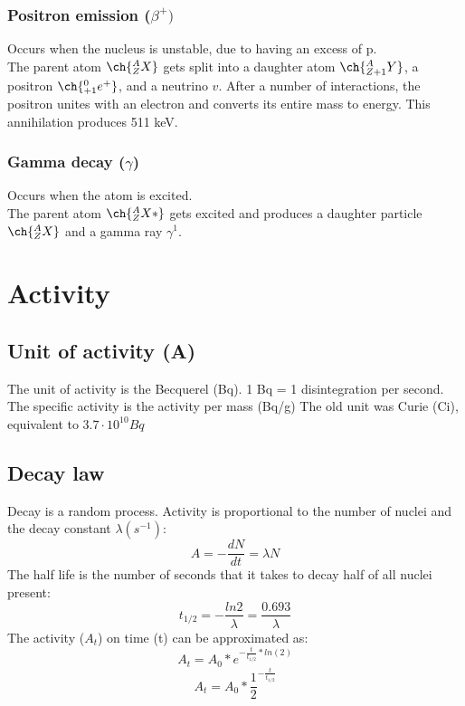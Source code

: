 \subsubsection{Positron emission ($\beta^{+})$}
Occurs when the nucleus is unstable, due to having an excess of p.\\
The parent atom $\ch{^{A}_{Z}X}$ gets split into a daughter atom $\ch{^{A}_{Z+1}Y}$, a positron $\ch{^{0}_{+1}e^{+}}$, and a neutrino $v$.
After a number of interactions, the positron unites with an electron and converts its entire mass to energy. This annihilation produces 511 keV.
\subsubsection{Gamma decay ($\gamma$)}
Occurs when the atom is excited.\\
The parent atom $\ch{^{A}_{Z}X*}$ gets excited and produces a daughter particle $\ch{^{A}_{Z}X}$ and a gamma ray $\gamma^{1}$.
\section{Activity}
\subsection{Unit of activity (A)}
The unit of activity is the Becquerel (Bq). 1 Bq = 1 disintegration per second.
The specific activity is the activity per mass (Bq/g)
The old unit was Curie (Ci), equivalent to $3.7·10^{10}Bq$
 \subsection{Decay law}
 Decay is a random process. 
Activity is proportional to the number of nuclei and the decay constant $\lambda (s^{-1})$:
\[ A = -\frac{dN}{dt} = \lambda N \]
The half life is the number of seconds that it takes to decay half of all nuclei present:
\[ t_{1/2} = -\frac{ln2}{\lambda} = \frac{0.693}{\lambda} \]
The activity ($A_t$) on time (t) can be approximated as:
\[ A_{t} = A_0 * e^{-\frac{t}{t_{1/2}}*ln(2)} \]
\[ A_{t} = A_0 * \frac{1}{2}^{-\frac{t}{t_{1/2}}} \]
